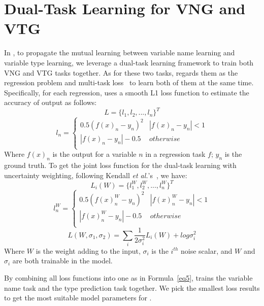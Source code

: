\section{Dual-Task Learning for VNG and VTG}
\label{sec:dual}

In {\tool}, to propagate the mutual learning between
variable name learning and variable type learning,
we leverage a dual-task learning framework to
train both VNG and VTG tasks together.
As for these two tasks, {\tool} regards them as the regression
problem and multi-task loss~\cite{kendall2018multi} to learn both of
them at the same time. Specifically, for each regression, \tool uses a
smooth L1 loss function to estimate the accuracy of output as follows:
\begin{equation}\label{eq1}
L = \{l_1, l_2, ..., l_n\}^T
\end{equation}
\begin{equation}\label{eq2}
l_n = \left\{ 
	\begin{array}{lr}
    	0.5(f(x)_n-y_n)^2  & |f(x)_n-y_n|<1 \\
   	    |f(x)_n-y_n|-0.5   & otherwise   \\
	\end{array}
\right.
\end{equation}
Where $f(x)_n$ is the output for a variable $n$ in a regression task
$f$; $y_n$ is the ground truth. To get the joint loss function for the
dual-task learning with uncertainty weighting, following Kendall {\em
  et al.}'s~\cite{kendall2018multi}, we have:
\begin{equation}\label{eq3}
L_i(W) = \{l_1^W, l_2^W, ..., l_n^W\}^T
\end{equation}
\begin{equation}\label{eq4}
l_n^W = \left\{ 
	\begin{array}{lr}
		0.5(f(x)^W_n-y_n)^2  & |f(x)^W_n-y_n|<1 \\
		|f(x)^W_n-y_n|-0.5   & otherwise   \\
	\end{array}
\right.
\end{equation}
\begin{equation}\label{eq5}
L(W, \sigma_1, \sigma_2) = \sum_i\frac{1}{2\sigma_i^2}L_i(W) + log \sigma^2_i
\end{equation}
Where $W$ is the weight adding to the input, $\sigma_i$ is the $i^{th}$ noise scalar, and $W$ and $\sigma_i$ are both trainable in the model.

By combining all loss functions into one as in Formula~\ref{eq5},
{\tool} trains the variable name task and the type prediction task
together. We pick the smallest loss results to get the most suitable
model parameters for {\tool}.
